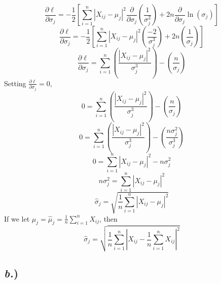 \documentclass{report}
\begin{document}
$$ \frac{\partial \ell}{\partial \sigma_j} =  -\frac{1}{2}\left[\sum_{i=1}^n{|X_{ij}-\mu_j|^2\frac{\partial}{\partial \sigma_j}\left(\frac{1}{\sigma_{j}^2}\right)}+  2n\frac{\partial}{\partial \sigma_j} \ln (\sigma_j)\right]$$
$$ \frac{\partial \ell}{\partial \sigma_j} =  -\frac{1}{2}\left[\sum_{i=1}^n{|X_{ij}-\mu_j|^2\left(\frac{-2}{\sigma_{j}^3}\right)}+  2n\left(\frac{1}{\sigma_j}\right)\right]$$
$$ \frac{\partial \ell}{\partial \sigma_j} =  \sum_{i=1}^n{\left(\frac{|X_{ij}-\mu_j|^2}{\sigma_{j}^3}\right)} - \left(\frac{n}{\sigma_j}\right)$$
Setting $\frac{\partial \ell}{\partial \sigma_j} = 0,$
$$ 0 =  \sum_{i=1}^n{\left(\frac{|X_{ij}-\mu_j|^2}{\sigma_{j}^3}\right)} - \left(\frac{n}{\sigma_j}\right)$$
$$ 0 =  \sum_{i=1}^n{\left(\frac{|X_{ij}-\mu_j|^2}{\sigma_{j}^3}\right)} - \left(\frac{n\sigma_j^2}{\sigma_j^3}\right)$$
$$ 0 =  \sum_{i=1}^n{|X_{ij}-\mu_j|^2} - n\sigma_j^2 $$
$$ n\sigma_j^2 =  \sum_{i=1}^n{|X_{ij}-\mu_j|^2} $$
$$ \hat{\sigma}_j =  \sqrt{\frac{1}{n}\sum_{i=1}^n{|X_{ij}-\mu_j|^2}} $$
If we let $\mu_j = \hat{\mu}_j = \frac{1}{n}\sum_{i=1}^n{X_{ij}}$, then
$$\boxed{ \hat{\sigma}_j =  \sqrt{\frac{1}{n}\sum_{i=1}^n{\left|X_{ij}-\frac{1}{n}\sum_{i=1}^n{X_{ij}}\right|^2}} }$$



\subsection*{\textit{b.})}
\end{document}
